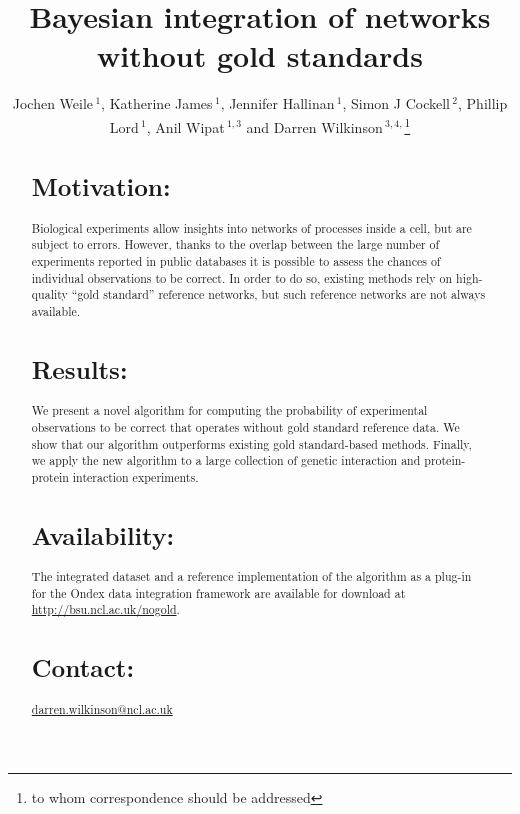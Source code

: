 \documentclass{bioinfo}
\begin{document}

\title[Bayesian integration of networks without gold standards]{Bayesian integration of networks without gold standards}

\author[J. Weile \textit{et~al.}]{Jochen Weile\,$^{1}$, Katherine James\,$^{1}$, Jennifer Hallinan\,$^{1}$, Simon J Cockell\,$^{2}$, Phillip Lord\,$^{1}$, Anil Wipat\,$^{1,3}$ and Darren Wilkinson\,$^{3,4,}$\footnote{to whom correspondence should be addressed}}

\address{$^{1}$School of Computing Science, $^{2}$Bioinformatics Support Unit, $^{3}$Centre for Integrative Systems Biology of Ageing and Nutrition, $^{4}$School of Mathematics and Statistics, Newcastle University, Newcastle upon Tyne NE1 7RU, United Kingdom}



\maketitle

\begin{abstract}
\section{Motivation:}
Biological experiments allow insights into networks of processes inside a cell, but are subject to errors. However, thanks to the overlap between the large number of experiments reported in public databases it is possible to assess the chances of individual observations to be correct. In order to do so, existing methods rely on high-quality ``gold standard'' reference networks, but such reference networks are not always available.

\section{Results:}
We present a novel algorithm for computing the probability of experimental observations to be correct that operates without gold standard reference data. We show that our algorithm outperforms existing gold standard-based methods. Finally, we apply the new algorithm to a large collection of genetic interaction and protein-protein interaction experiments.

\section{Availability:}
The integrated dataset and a reference implementation of the algorithm as a plug-in for the Ondex data integration framework are available for download at \href{http://bsu.ncl.ac.uk/nogold}{http://bsu.ncl.ac.uk/nogold}.

\section{Contact:} \href{darren.wilkinson@ncl.ac.uk}{darren.wilkinson@ncl.ac.uk}
\end{abstract}
\end{document}
